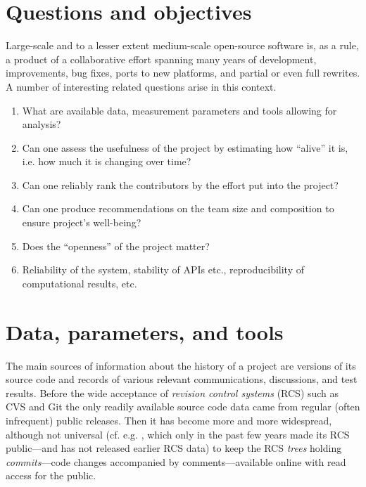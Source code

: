 \documentclass{deliverablereport}
\author{Dmitrii Pasechnik}
\begin{document}
\maketitle
%
\strut\githubissuedescription
\newpage\tableofcontents

\section{Questions and objectives}

Large-scale and to a lesser extent medium-scale open-source software 
is, as a rule, a product of a collaborative effort spanning many years of
development, improvements, bug fixes, ports to new platforms,
and partial or even full rewrites. A number of interesting related questions
arise in this context.
\begin{enumerate}
\item What are available data, measurement parameters and tools
allowing for analysis?
\item Can one assess the usefulness of the project by estimating
how ``alive'' it is, i.e. how much it is changing over time?
\item Can one reliably rank the contributors
by the effort put into the project?
\item Can one produce recommendations on the team size and composition
to ensure project's well-being?
\item Does the ``openness'' of the project matter?
\item Reliability of the system, stability of APIs etc., 
reproducibility of computational results, etc.
\end{enumerate}

\section{Data, parameters, and tools}

The main sources of information about the history of a project are versions of
its source code and records of various relevant communications, discussions, and
test results.  Before the wide acceptance of {\em revision control systems} 
(RCS) \cite{OSullivan:MakingSenseOfRCS} such as  CVS \cite{CVSWeb} and
Git \cite{ChaStr:pg14} the only readily available source code data came from
regular (often infrequent) public releases. Then it has become
more and more widespread, although not universal (cf. e.g. \GAP \cite{gap},
which only in the past few years made its RCS 
public---and has not released earlier RCS data)
to keep the RCS {\em trees} holding {\em commits}---code changes
accompanied by comments---available online with read access for the public.
\end{document}
